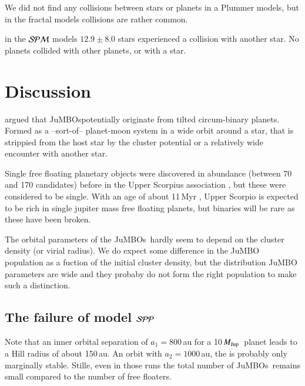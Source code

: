 \documentclass[aa]{lib/aa}
\newcommand{\MJup}{\mbox{${M}_{\rm Jup}$}}
\newcommand{\jumbo}{\mbox{JuMBO}}
\newcommand{\jumbos}{\mbox{JuMBOs}}
\begin{document}
We did not find any collisions between stars or planets in a Plummer
models, but in the fractal models collisions are rather common.

in the ${\cal SPM}$ models $12.9\pm8.0$ stars experienced a collision
with another star. No planets collided with other planets, or with a
star.


\section{Discussion}


\cite{2023arXiv231015603C} argued that \jumbos potentially originate
from tilted circum-binary planets. Formed as a --sort-of-- planet-moon
system in a wide orbit around a star, that is strippied from the host
star by the cluster potential or a relatively wide encounter with
another star. 


Single free floating planetary objects were discovered in abundance
(between 70 and 170 candidates) before in the Upper Scorpius
association \cite{2022NatAs...6...89M}, but these were considered to
be single.  With an age of about 11\,Myr \cite{++}, Upper Scorpio is
expected to be rich in single jupiter mass free floating planets, but
binaries will be rare as these have been broken.

The orbital parameters of the \jumbos\, hardly seem to depend on the
cluster density (or virial radius). We do expect some difference in
the \jumbo\, population as a fuction of the initial cluster density,
but the distribution \jumbo\, parameters are wide and they probaby do
not form the right population to make such a distinction.

\subsection{The failure of model ${\cal SPP}$}

Note that an inner orbital separation of $a_1=800$\,au for a
10\,\MJup\, planet leads to a Hill radius of about 150\,au. An orbit
with $a_2=1000$\,au, the is probably only marginally stable.  Stille,
even in those runs the total number of \jumbos\, remains small
compared to the number of free floaters.
\end{document}
